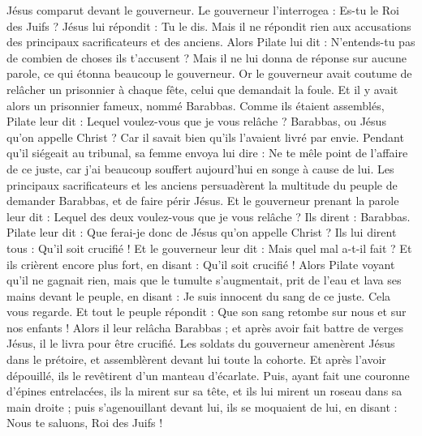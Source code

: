 \begin{multicols}{2}
Jésus comparut devant le gouverneur. Le gouverneur l'interrogea : Es-tu le Roi des Juifs ? Jésus lui répondit : Tu le dis.
Mais il ne répondit rien aux accusations des principaux sacrificateurs et des anciens.
Alors Pilate lui dit : N'entends-tu pas de combien de choses ils t’accusent ?
Mais il ne lui donna de réponse sur aucune parole, ce qui étonna beaucoup le gouverneur.
Or le gouverneur avait coutume de relâcher un prisonnier à chaque fête, celui que demandait la foule.
Et il y avait alors un prisonnier fameux, nommé Barabbas.
Comme ils étaient assemblés, Pilate leur dit : Lequel voulez-vous que je vous relâche ? Barabbas, ou Jésus qu'on appelle Christ ?
Car il savait bien qu'ils l'avaient livré par envie.
Pendant qu’il siégeait au tribunal, sa femme envoya lui dire : Ne te mêle point de l'affaire de ce juste, car j'ai beaucoup souffert aujourd'hui en songe à cause de lui.
Les principaux sacrificateurs et les anciens persuadèrent la multitude du peuple de demander Barabbas, et de faire périr Jésus.
Et le gouverneur prenant la parole leur dit : Lequel des deux voulez-vous que je vous relâche ? Ils dirent : Barabbas.
Pilate leur dit : Que ferai-je donc de Jésus qu'on appelle Christ ? Ils lui dirent tous : Qu’il soit crucifié !
Et le gouverneur leur dit : Mais quel mal a-t-il fait ? Et ils crièrent encore plus fort, en disant : Qu’il soit crucifié !
Alors Pilate voyant qu'il ne gagnait rien, mais que le tumulte s'augmentait, prit de l'eau et lava ses mains devant le peuple, en disant : Je suis innocent du sang de ce juste. Cela vous regarde.
Et tout le peuple répondit : Que son sang retombe sur nous et sur nos enfants !
Alors il leur relâcha Barabbas ; et après avoir fait battre de verges Jésus, il le livra pour être crucifié.
Les soldats du gouverneur amenèrent Jésus dans le prétoire, et assemblèrent devant lui toute la cohorte.
Et après l'avoir dépouillé, ils le revêtirent d’un manteau d'écarlate.
Puis, ayant fait une couronne d'épines entrelacées, ils la mirent sur sa tête, et ils lui mirent un roseau dans sa main droite ; puis s'agenouillant devant lui, ils se moquaient de lui, en disant : Nous te saluons, Roi des Juifs !

\end{multicols}
